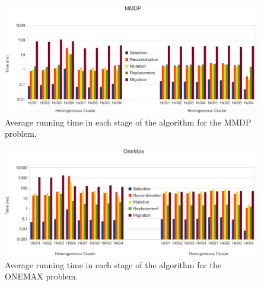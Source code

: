 \begin{figure}
\centering
\includegraphics[scale =0.19] {gfx/adaptiveresults/timingMMDP.pdf}
\caption{Average running time in each stage of the algorithm for the MMDP problem.}
\label{fig:MMDPbars}
\end{figure}

\begin{figure}
\centering
\includegraphics[scale =0.19] {gfx/adaptiveresults/timingONEMAX.pdf}
\caption{Average running time in each stage of the algorithm for the ONEMAX problem.}
\label{fig:ONEMAXbars}
\end{figure}

